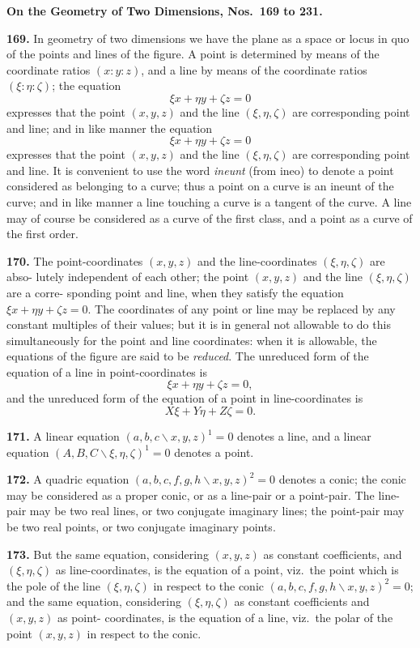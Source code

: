 \documentclass[11pt,a4paper]{book}
\begin{document}
\begin{center}
\medskip
\textbf{On the Geometry of Two Dimensions, Nos.~169 to 231.}

\textbf{169.} In geometry of two dimensions we have the plane as a space or locus in
quo of the points and lines of the figure. A point is determined by means of the
coordinate ratios $(x:y:z)$, and a line by means of the coordinate ratios $(\xi:\eta:\zeta)$;
the equation
\[
\xi x+\eta y+\zeta z=0
\]
expresses that the point $(x,y,z)$ and the line $(\xi,\eta,\zeta)$ are corresponding point and line;
and in like manner the equation
\[
\xi x+\eta y+\zeta z=0
\]
expresses that the point $(x,y,z)$ and the line $(\xi,\eta,\zeta)$ are corresponding point and line.
It is convenient to use the word \textit{ineunt} (from ineo) to denote a point considered as
belonging to a curve; thus a point on a curve is an ineunt of the curve; and in like
manner a line touching a curve is a tangent of the curve. A line may of course be
considered as a curve of the first class, and a point as a curve of the first order.

\textbf{170.} The point-coordinates $(x,y,z)$ and the line-coordinates $(\xi,\eta,\zeta)$ are abso-
lutely independent of each other; the point $(x,y,z)$ and the line $(\xi,\eta,\zeta)$ are a corre-
sponding point and line, when they satisfy the equation $\xi x+\eta y+\zeta z=0$. The
coordinates of any point or line may be replaced by any constant multiples of their
values; but it is in general not allowable to do this simultaneously for the point and
line coordinates: when it is allowable, the equations of the figure are said to be
\textit{reduced}. The unreduced form of the equation of a line in point-coordinates is
\[
\xi x+\eta y+\zeta z=0,
\]
and the unreduced form of the equation of a point in line-coordinates is
\[
X\xi+Y\eta+Z\zeta=0.
\]

\textbf{171.} A linear equation $(a,b,c\!\backslash x,y,z)^1=0$ denotes a line, and a linear equation
$(A,B,C\!\backslash \xi,\eta,\zeta)^1=0$ denotes a point.

\textbf{172.} A quadric equation $(a,b,c,f,g,h\!\backslash x,y,z)^2=0$ denotes a conic; the conic
may be considered as a proper conic, or as a line-pair or a point-pair. The line-pair
may be two real lines, or two conjugate imaginary lines; the point-pair may be two
real points, or two conjugate imaginary points.

\textbf{173.} But the same equation, considering $(x,y,z)$ as constant coefficients, and
$(\xi,\eta,\zeta)$ as line-coordinates, is the equation of a point, viz.\ the point which is the
pole of the line $(\xi,\eta,\zeta)$ in respect to the conic $(a,b,c,f,g,h\!\backslash x,y,z)^2=0$; and the
same equation, considering $(\xi,\eta,\zeta)$ as constant coefficients and $(x,y,z)$ as point-
coordinates, is the equation of a line, viz.\ the polar of the point $(x,y,z)$ in respect to
the conic.


\end{center}
\end{document}

